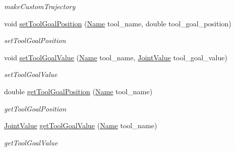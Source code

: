 \begin{DoxyCompactItemize}
\begin{DoxyCompactList}\small\item\em make\+Custom\+Trajectory \end{DoxyCompactList}\item 
void \hyperlink{classrobotis__manipulator_1_1_trajectory_a511789dcd0003c3afaacbf7f58f56ec2}{set\+Tool\+Goal\+Position} (\hyperlink{namespacerobotis__manipulator_a08c2d25e77a01ad75b9bb740f8ce4765}{Name} tool\+\_\+name, double tool\+\_\+goal\+\_\+position)
\begin{DoxyCompactList}\small\item\em set\+Tool\+Goal\+Position \end{DoxyCompactList}\item 
void \hyperlink{classrobotis__manipulator_1_1_trajectory_af02155337e38fdd5fc4c09e7ee066851}{set\+Tool\+Goal\+Value} (\hyperlink{namespacerobotis__manipulator_a08c2d25e77a01ad75b9bb740f8ce4765}{Name} tool\+\_\+name, \hyperlink{namespacerobotis__manipulator_aa0556c98c5294ccf3a96c2d0fe315e40}{Joint\+Value} tool\+\_\+goal\+\_\+value)
\begin{DoxyCompactList}\small\item\em set\+Tool\+Goal\+Value \end{DoxyCompactList}\item 
double \hyperlink{classrobotis__manipulator_1_1_trajectory_a59589016316f09e9f5894c6e47d0e7af}{get\+Tool\+Goal\+Position} (\hyperlink{namespacerobotis__manipulator_a08c2d25e77a01ad75b9bb740f8ce4765}{Name} tool\+\_\+name)
\begin{DoxyCompactList}\small\item\em get\+Tool\+Goal\+Position \end{DoxyCompactList}\item 
\hyperlink{namespacerobotis__manipulator_aa0556c98c5294ccf3a96c2d0fe315e40}{Joint\+Value} \hyperlink{classrobotis__manipulator_1_1_trajectory_af731f5f58a734655772c56467488262f}{get\+Tool\+Goal\+Value} (\hyperlink{namespacerobotis__manipulator_a08c2d25e77a01ad75b9bb740f8ce4765}{Name} tool\+\_\+name)
\begin{DoxyCompactList}\small\item\em get\+Tool\+Goal\+Value \end{DoxyCompactList}\end{DoxyCompactItemize}
